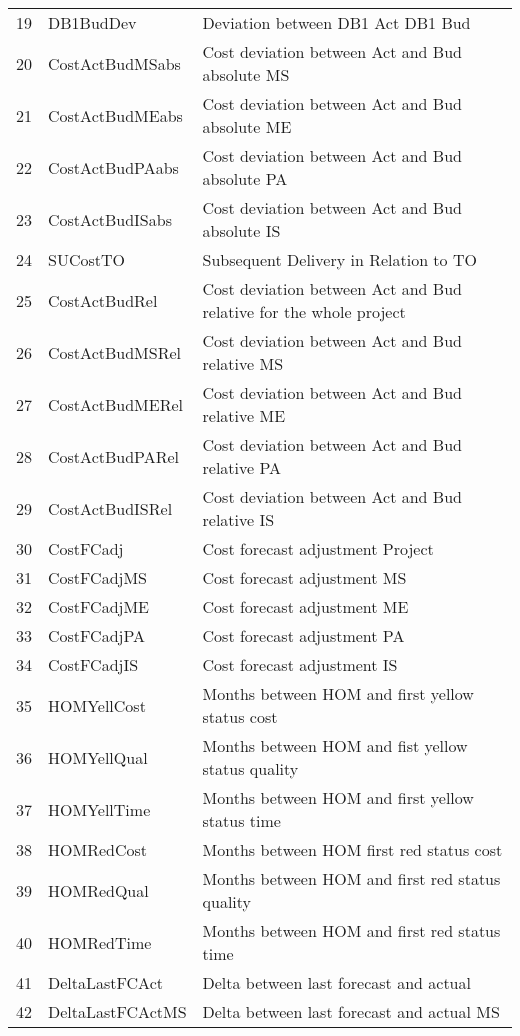 \begin{longtable}[ht]{p{} p{}p{}}
19    & DB1BudDev & Deviation between DB1 Act DB1 Bud \\
20    & CostActBudMSabs & Cost deviation between Act and Bud absolute MS \\
21    & CostActBudMEabs & Cost deviation between Act and Bud absolute ME \\
22    & CostActBudPAabs & Cost deviation between Act and Bud absolute PA \\
23    & CostActBudISabs & Cost deviation between Act and Bud absolute IS \\
24    & SUCostTO & Subsequent Delivery in Relation to TO \\
25    & CostActBudRel & Cost deviation between Act and Bud relative for the whole project \\
26    & CostActBudMSRel & Cost deviation between Act and Bud relative MS \\
27    & CostActBudMERel & Cost deviation between Act and Bud relative ME\\
28    & CostActBudPARel & Cost deviation between Act and Bud relative PA \\
29    & CostActBudISRel & Cost deviation between Act and Bud relative IS \\
30    & CostFCadj & Cost forecast adjustment Project \\
31    & CostFCadjMS & Cost forecast adjustment MS \\
32    & CostFCadjME & Cost forecast adjustment ME \\
33    & CostFCadjPA & Cost forecast adjustment PA \\
34    & CostFCadjIS & Cost forecast adjustment IS \\
35    & HOMYellCost & Months between HOM and first yellow status cost \\
36    & HOMYellQual & Months between HOM and fist yellow status quality \\
37    & HOMYellTime & Months between HOM and first yellow status time \\
38    & HOMRedCost & Months between HOM first red status cost \\
39    & HOMRedQual & Months between HOM and first red status quality \\
40    & HOMRedTime & Months between HOM and first red status time \\
41    & DeltaLastFCAct & Delta between last forecast and actual  \\
42    & DeltaLastFCActMS & Delta between last forecast and actual MS \\

\end{longtable}
